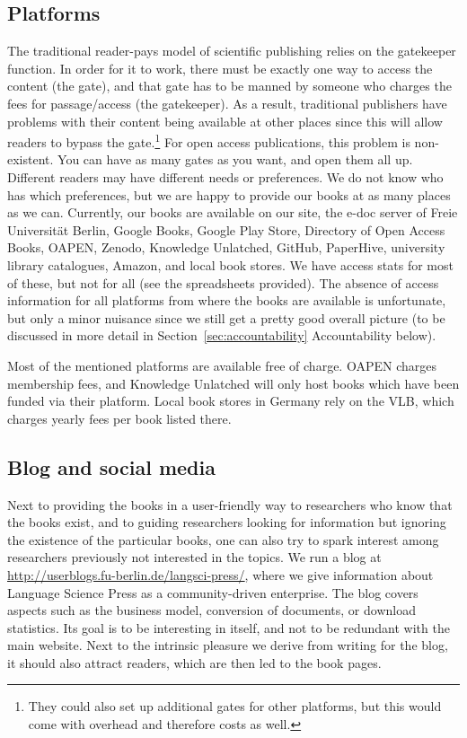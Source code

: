 \documentclass[nonflat,smallfont
]{langsci/langscibook}
\begin{document}
\subsection{Platforms}
The traditional reader-pays model of scientific publishing relies on the gatekeeper function. In order for it to work, there must be exactly one way to access the content (the gate), and that gate has to be manned by someone who charges the fees for passage\slash access (the gatekeeper). As a result, traditional publishers have problems with their content being available at other places since this will allow readers to bypass the gate.\footnote{They could also set up additional gates for other platforms, but this would come with overhead and therefore costs as well.} For open access publications, this problem is non-existent. You can have as many gates as you want, and open them all up. Different readers may have different needs or preferences. We do not know who has which preferences, but we are happy to provide our books at as many places as we can. Currently, our books are available on our site, the e-doc server of Freie Universität Berlin, Google Books, Google Play Store, Directory of Open Access Books, OAPEN, Zenodo, Knowledge Unlatched, GitHub, PaperHive, university library catalogues, Amazon, and local book stores. We have access stats for most of these, but not for all (see the spreadsheets provided). The absence of access information for all platforms from where the books are available is unfortunate, but only a minor nuisance since we still get a pretty good overall picture (to be discussed in more detail in Section~\ref{sec:accountability} Accountability below).

Most of the mentioned platforms are available free of charge. OAPEN charges membership fees, and Knowledge Unlatched will only host books which have been funded via their platform. Local book stores in Germany rely on the VLB, which charges yearly fees per book   listed there.

\subsection{Blog and social media}
Next to providing the books in a user-friendly way to researchers who know that the books exist, and to guiding researchers looking for information but ignoring the existence of the particular books, one can also try to spark interest among researchers previously not interested in the topics. We run a blog at \url{http://userblogs.fu-berlin.de/langsci-press/}, where we give information about Language Science Press as a community-driven enterprise. The blog covers aspects such as the business model, conversion of documents, or download statistics. Its goal is to be interesting in itself, and not to be redundant with the main website. Next to the intrinsic pleasure we derive from writing for the blog, it should also attract readers, which are then led to the book pages.  
\end{document}
